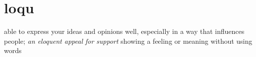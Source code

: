 \chapter{loqu}

\begin{vocabulary}
    able to express your ideas and opinions well, especially in a way that influences people;
    \textit{an eloquent appeal for support}
showing a feeling or meaning without using words
\end{vocabulary}

\begin{vocabulary}[loquacious]
\end{vocabulary}